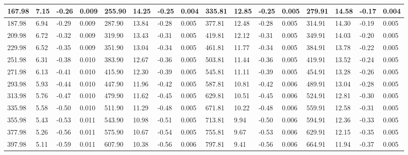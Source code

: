 \documentclass[a4paper,12pt]{article}
\begin{document}
\begin{enumerate}
\begin{table}
\begin{tabular}{|l|l|l|l|l|l|l|l|l|l|l|l|l|l|l|l|}
		167.98 & 7.15   & -0.26    & 0.009          & 255.90 & 14.25  & -0.25    & 0.004          & 335.81 & 12.85  & -0.25    & 0.005          & 279.91 & 14.58  & -0.17    & 0.004          \\ \hline
		187.98 & 6.94   & -0.29    & 0.009          & 287.90 & 13.84  & -0.28    & 0.005          & 377.81 & 12.48  & -0.28    & 0.005          & 314.91 & 14.30  & -0.19    & 0.005          \\ \hline
		209.98 & 6.72   & -0.32    & 0.009          & 319.90 & 13.43  & -0.31    & 0.005          & 419.81 & 12.12  & -0.31    & 0.005          & 349.91 & 14.03  & -0.20    & 0.005          \\ \hline
		229.98 & 6.52   & -0.35    & 0.009          & 351.90 & 13.04  & -0.34    & 0.005          & 461.81 & 11.77  & -0.34    & 0.005          & 384.91 & 13.78  & -0.22    & 0.005          \\ \hline
		251.98 & 6.31   & -0.38    & 0.010          & 383.90 & 12.67  & -0.36    & 0.005          & 503.81 & 11.44  & -0.36    & 0.005          & 419.91 & 13.52  & -0.24    & 0.005          \\ \hline
		271.98 & 6.13   & -0.41    & 0.010          & 415.90 & 12.30  & -0.39    & 0.005          & 545.81 & 11.11  & -0.39    & 0.005          & 454.91 & 13.28  & -0.26    & 0.005          \\ \hline
		293.98 & 5.93   & -0.44    & 0.010          & 447.90 & 11.96  & -0.42    & 0.005          & 587.81 & 10.81  & -0.42    & 0.006          & 489.91 & 13.04  & -0.28    & 0.005          \\ \hline
		313.98 & 5.76   & -0.47    & 0.010          & 479.90 & 11.62  & -0.45    & 0.005          & 629.81 & 10.51  & -0.45    & 0.006          & 524.91 & 12.81  & -0.30    & 0.005          \\ \hline
		335.98 & 5.58   & -0.50    & 0.010          & 511.90 & 11.29  & -0.48    & 0.005          & 671.81 & 10.22  & -0.48    & 0.006          & 559.91 & 12.58  & -0.31    & 0.005          \\ \hline
		355.98 & 5.43   & -0.53    & 0.011          & 543.90 & 10.98  & -0.51    & 0.005          & 713.81 & 9.94   & -0.50    & 0.006          & 594.91 & 12.36  & -0.33    & 0.005          \\ \hline
		377.98 & 5.26   & -0.56    & 0.011          & 575.90 & 10.67  & -0.54    & 0.005          & 755.81 & 9.67   & -0.53    & 0.006          & 629.91 & 12.15  & -0.35    & 0.005          \\ \hline
		397.98 & 5.11   & -0.59    & 0.011          & 607.90 & 10.38  & -0.56    & 0.006          & 797.81 & 9.41   & -0.56    & 0.006          & 664.91 & 11.94  & -0.37    & 0.005          \\ \hline

\end{tabular}
\end{table}
\end{enumerate}
\end{document}
